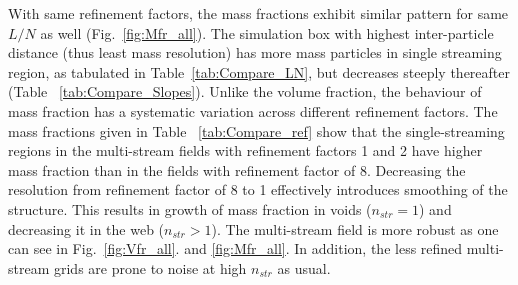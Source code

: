 With same refinement factors, the mass fractions exhibit similar pattern for same $L/N$ as well (Fig.~\ref{fig:Mfr_all}). The simulation box with highest inter-particle distance (thus least mass resolution) has more mass particles in single streaming region, as tabulated in Table~\ref{tab:Compare_LN}, but decreases steeply thereafter (Table ~\ref{tab:Compare_Slopes}). Unlike the volume fraction, the behaviour of mass fraction has a systematic variation across different refinement factors. The mass fractions given in Table ~\ref{tab:Compare_ref} show that the single-streaming regions in the multi-stream fields with refinement factors 1 and 2 have higher mass fraction than in the fields with refinement factor of 8. Decreasing the resolution from refinement factor of 8 to 1 effectively introduces smoothing of the structure. This results in growth of mass fraction in voids ($n_{str} = 1$) and decreasing it in the web ($n_{str} > 1$). The multi-stream field is more robust as one can see in Fig.~\ref{fig:Vfr_all}. and \ref{fig:Mfr_all}. In addition, the less refined multi-stream grids are prone to noise at high $n_{str}$ as usual.
